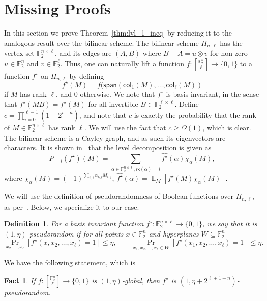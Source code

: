 \documentclass[11pt]{article}
\newtheorem{fact}[thm]{Fact}
\newtheorem{definition}[thm]{Definition}
\newcommand\Prob[2]{{\Pr_{#1}\left[ {#2} \right]}}
\newcommand\Expect[2]{{\mathop{\mathbb{E}}_{#1}\left[ {#2} \right]}}
\renewcommand\geq{\geqslant}
\renewcommand\leq{\leqslant}
\providecommand{\sqbinom}[2]{\genfrac{[}{]}{0pt}{}{#1}{#2}}
\begin{document}
\section{Missing Proofs}\label{sec:apx}
In this section we prove Theorem~\ref{thm:lvl_1_ineq} by reducing it to the analogous result over the bilinear scheme.
The bilinear scheme $H_{n,\ell}$ has the vertex set $\mathbb{F}_2^{n\times \ell}$, and its edges are $(A,B)$ where $B-A = u\otimes v$ for non-zero $u\in\mathbb{F}_2^n$ and $v\in\mathbb{F}_2^{\ell}$. Thus, one can naturally lift a function $f\colon {\sqbinom{\mathbb{F}_2^n}{\ell}}\to\{0,1\}$ to a function $f^{\star}$ on $H_{n,\ell}$ by defining
\[
f^{\star}(M) = f(\mathsf{span}(\mathsf{col}_1(M),\ldots,\mathsf{col}_{\ell}(M))
\]
if $M$ has rank $\ell$, and $0$ otherwise. We note that $f^{\star}$ is basis invariant, in the sense that $f^{\star}(MB) = f^{\star}(M)$ for all invertible $B\in\mathbb{F}_2^{\ell\times\ell}$.
Define $c = \prod\limits_{i=0}^{\ell-1}(1-2^{i-n})$, and note that $c$ is exactly the probability that the rank of $M\in\mathbb{F}_2^{n\times \ell}$  has rank $\ell$. We will use the fact that $c\geq \Omega(1)$, which is clear. The bilinear scheme is a Cayley graph, and as such its eigenvectors are characters. It is shown in~\cite{KMS2} that the level decomposition is given as
\[
P_{=i} (f^{\star})(M)
=\sum\limits_{\alpha\in\mathbb{F}_2^{n\times \ell}, \mathsf{rk}(\alpha)=i}\widehat{f^{\star}}(\alpha)\chi_{\alpha}(M),
\]
where $\chi_{\alpha}(M) = (-1)^{\sum_{i,j}\alpha_{i,j}M_{i,j}}$, $\widehat{f^{\star}}(\alpha) = \Expect{M}{f^{\star}(M)\chi_{\alpha}(M)}$.



We will use the definition of pseudorandomness of Boolean functions over $H_{n,\ell}$, as per~\cite[Definition 2.5]{KMS2}. Below, we specialize it to our case.
\begin{definition}
    For a basis invariant function $f^{\star}\colon \mathbb{F}_2^{n\times \ell}\to\{0,1\}$, we say that it is $(1,\eta)$-pseudorandom if for all points $x\in\mathbb{F}_2^n$ and hyperplanes 
    $W\subseteq \mathbb{F}_2^n$
    \[
    \Prob{x_2,\ldots,x_{\ell}}{f^{\star}(x,x_2,\ldots,x_{\ell})=1}\leq \eta,
    \qquad
    \Prob{x_1,x_2,\ldots,x_{\ell}\in W}{f^{\star}(x_1,x_2,\ldots,x_{\ell})=1}\leq \eta.
    \]
\end{definition}
We have the following statement, which is~\cite[Lemma 2.8]{KMS2}
\begin{fact}\label{fact:global}
    If $f\colon {\sqbinom{\mathbb{F}_2^n}{\ell}}\to\{0,1\}$ is $(1,\eta)$-global, then 
    $f^{\star}$ is 
    $(1,\eta+2^{\ell+1-n})$-pseudorandom.
\end{fact}
\end{document}
